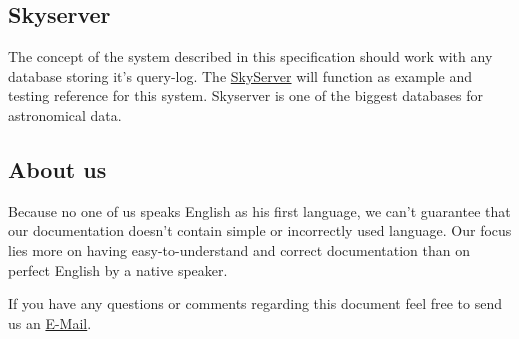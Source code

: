 \subsection*{Skyserver}
The concept of the system described in this specification should work with any database
storing it's query-log. The \href{http://skyserver.sdss.org/public/en/}{SkyServer} will function
as example and testing reference for this system. Skyserver is one of the biggest databases for astronomical data.

\subsection*{About us}
Because no one of us speaks English as his first language,
we can't guarantee that our documentation doesn't contain simple
or incorrectly used language. Our focus lies more on
having easy-to-understand and correct documentation
than on perfect English by a native speaker.

If you have any questions or comments regarding this document feel free to send us an 
 \href{mailto:pse10-group14-ws12@ira.uni-karlsruhe.de}{E-Mail}.







